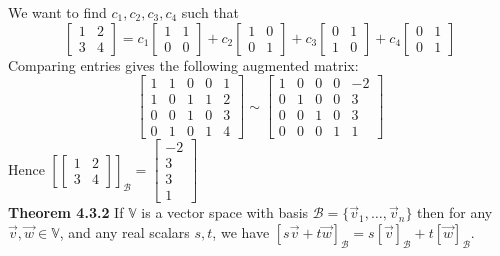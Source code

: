 \documentclass[10pt,letter]{article}
\begin{document}
We want to find $c_1,c_2,c_3,c_4$ such that $$\begin{bmatrix}1&2\\3&4\end{bmatrix}=c_1\begin{bmatrix}1&1\\0&0\end{bmatrix}+c_2\begin{bmatrix}1&0\\0&1\end{bmatrix}+c_3\begin{bmatrix}0&1\\1&0\end{bmatrix}+c_4\begin{bmatrix}0&1\\0&1\end{bmatrix}$$ Comparing entries gives the following augmented matrix: $$\left[\begin{array}{rrrr|r}
   1 & 1 & 0&0 & 1\\
    1 & 0 & 1 & 1&2 \\
    0 & 0 & 1&0 & 3 \\
    0&1&0&1&4
\end{array}\right]\sim\left[\begin{array}{rrrr|r}
   1 & 0 & 0 & 0&-2\\
    0 &1& 0 & 0 & 3 \\
    0 & 0 & 1 & 0&3\\ 
    0&0&0&1&1
\end{array}\right]$$ Hence $[\begin{bmatrix}1&2\\3&4\end{bmatrix}]_\mathcal{B}=\begin{bmatrix}-2\\3\\3\\1\end{bmatrix}$ \\
\textbf{Theorem 4.3.2} If $\mathbb{V}$ is a vector space with basis $\mathcal{B}=\{\vec{v}_1,\ldots,\vec{v}_n\}$ then for any $\vec{v},\vec{w}\in\mathbb{V}$, and any real scalars $s,t$, we have $[s\vec{v}+t\vec{w}]_\mathcal{B}=s[\vec{v}]_\mathcal{B}+t[\vec{w}]_\mathcal{B}$. 
\end{document}
